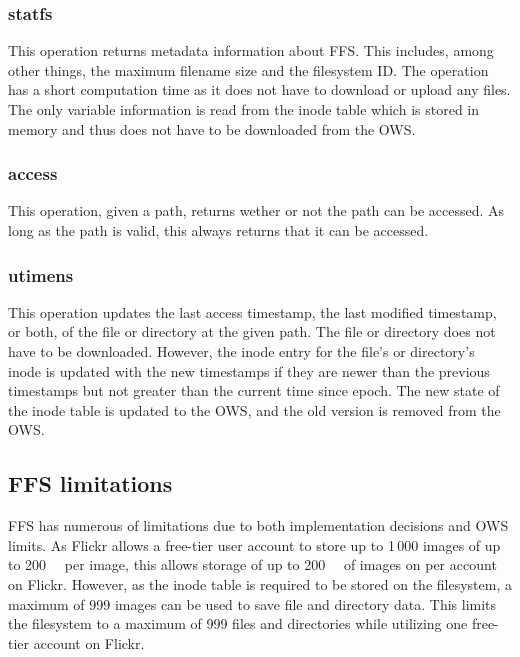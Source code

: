 \subsubsection{statfs}
This operation returns metadata information about FFS. This includes, among other things, the maximum filename size and the filesystem ID. The operation has a short computation time as it does not have to download or upload any files. The only variable information is read from the inode table which is stored in memory and thus does not have to be downloaded from the OWS.

\subsubsection{access}
This operation, given a path, returns wether or not the path can be accessed. As long as the path is valid, this always returns that it can be accessed.

\subsubsection{utimens}
This operation updates the last access timestamp, the last modified timestamp, or both, of the file or directory at the given path. The file or directory does not have to be downloaded. However, the inode entry for the file's or directory's inode is updated with the new timestamps if they are newer than the previous timestamps but not greater than the current time since epoch. The new state of the inode table is updated to the OWS, and the old version is removed from the OWS.


\subsection{FFS limitations}
\label{subsec:ffs_limits}
FFS has numerous of limitations due to both implementation decisions and OWS limits. As Flickr allows a free-tier user account to store up to 1\,000 images of up to \SI{200}{\mega\byte} per image, this allows storage of up to \SI{200}{\giga\byte} of images on per account on Flickr. However, as the inode table is required to be stored on the filesystem, a maximum of 999 images can be used to save file and directory data. This limits the filesystem to a maximum of 999 files and directories while utilizing one free-tier account on Flickr. 

